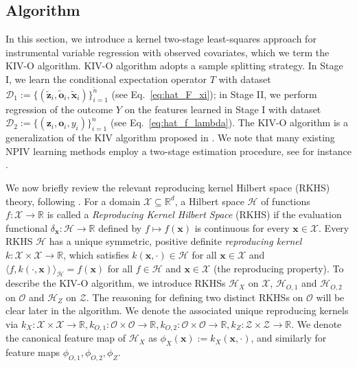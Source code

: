 \documentclass[11pt]{article}
\newcommand{\stageonesamples}{\tilde{n}}
\newcommand{\bx}{\mathbf x}
\newcommand{\bz}{\mathbf z}
\newcommand{\bo}{\mathbf o}
\newcommand{\calZ}{\mathcal{Z}}
\newcommand{\calH}{\mathcal{H}}
\newcommand{\calO}{\mathcal{O}}
\newcommand{\calX}{\mathcal{X}}
\newcommand{\calD}{\mathcal{D}}
\newcommand{\0}{\mathbf{0}}
\newcommand{\steve}[1]{#1}
\begin{document}
\subsection{Algorithm}
\label{sec:algorithm}
In this section, we introduce a kernel two-stage least-squares approach for instrumental variable regression with observed covariates, which we term the KIV-O algorithm. KIV-O algorithm adopts a sample splitting strategy. In Stage I, we learn the conditional expectation operator $T$ with dataset $\calD_1 := \{(\tilde{\bz}_{i}, \tilde{\bo}_i, \tilde{\bx}_i)\}_{i=1}^{\stageonesamples}$ (see Eq.~\eqref{eq:hat_F_xi}); in Stage II, \steve{we perform regression of the outcome $Y$ on the features learned in Stage I with dataset $\mathcal{D}_2 := \{(\bz_i, \bo_i, y_i)\}_{i=1}^{n}$ (see Eq.~\eqref{eq:hat_f_lambda}).}  The KIV-O algorithm is a generalization of the KIV algorithm proposed in \citet{singh2019kernel}. We note that many existing NPIV learning methods employ a two-stage estimation procedure, see for instance \citet{hartford2017deep, singh2019kernel, xu2020learning, li2024regularized, petrulionyte2024functional, khoury2025learning}. 

We now briefly review the relevant reproducing kernel Hilbert space (RKHS) theory, following \citet{berlinet2004reproducing}. 
For a domain $\calX\subseteq \mathbb{R}^{d}$, a Hilbert space $\calH$ of functions $f:\calX \to \mathbb{R}$ is called a \emph{Reproducing Kernel Hilbert Space} (RKHS) if the evaluation functional $\delta_{\bx}:\calH \to \mathbb{R}$ defined by $f \mapsto f(\bx)$ is continuous for every $\bx\in \calX$. Every RKHS $\calH$ has a unique symmetric, positive definite \emph{reproducing kernel} $k : \calX\times \calX\to \mathbb{R}$, which satisfies $k(\bx,\cdot)\in \calH$ for all $\bx\in \calX$ and $\langle f, k(\cdot, \bx)\rangle_{\calH} = f(\bx)$ for all $f\in \calH$ and $\bx\in \calX$ (the reproducing property). To describe the KIV-O algorithm, we introduce RKHSs $\calH_X$ on $\calX$, $\calH_{O,1}$ and $\calH_{O,2}$ on $\calO$ and $\calH_{Z}$ on $\calZ$. The reasoning for defining two distinct RKHSs on $\calO$ will be clear later in the algorithm. We denote the associated unique reproducing kernels via $k_{X}: \calX\times \calX\to \mathbb{R}, k_{O,1} : \calO\times \calO\to \mathbb{R}, k_{O,2}: \calO\times \calO\to \mathbb{R}, k_{Z} : \calZ\times \calZ\to \mathbb{R}$. We denote the canonical feature map of $\calH_{X}$ as $\phi_{X}(\bx) := k_{X}(\bx,\cdot)$, and similarly for feature maps $\phi_{O,1}, \phi_{O,2}, \phi_{Z}$.
\end{document}
